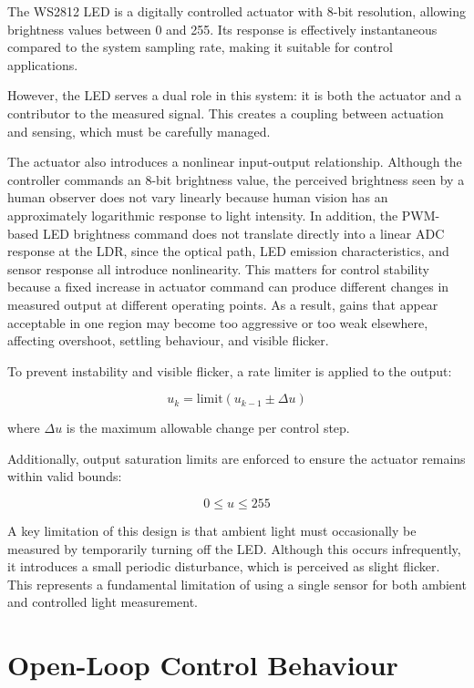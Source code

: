 \documentclass[conference]{IEEEtran}
\begin{document}
The WS2812 LED is a digitally controlled actuator with 8-bit resolution, allowing brightness values between 0 and 255. Its response is effectively instantaneous compared to the system sampling rate, making it suitable for control applications.

However, the LED serves a dual role in this system: it is both the actuator and a contributor to the measured signal. This creates a coupling between actuation and sensing, which must be carefully managed.

The actuator also introduces a nonlinear input-output relationship. Although the controller commands an 8-bit brightness value, the perceived brightness seen by a human observer does not vary linearly because human vision has an approximately logarithmic response to light intensity. In addition, the PWM-based LED brightness command does not translate directly into a linear ADC response at the LDR, since the optical path, LED emission characteristics, and sensor response all introduce nonlinearity. This matters for control stability because a fixed increase in actuator command can produce different changes in measured output at different operating points. As a result, gains that appear acceptable in one region may become too aggressive or too weak elsewhere, affecting overshoot, settling behaviour, and visible flicker.

To prevent instability and visible flicker, a rate limiter is applied to the output:

\begin{equation}
u_{k} = \text{limit}(u_{k-1} \pm \Delta u)
\end{equation}

where $\Delta u$ is the maximum allowable change per control step.

Additionally, output saturation limits are enforced to ensure the actuator remains within valid bounds:

\begin{equation}
0 \leq u \leq 255
\end{equation}

A key limitation of this design is that ambient light must occasionally be measured by temporarily turning off the LED. Although this occurs infrequently, it introduces a small periodic disturbance, which is perceived as slight flicker. This represents a fundamental limitation of using a single sensor for both ambient and controlled light measurement.

\section{Open-Loop Control Behaviour}
\end{document}

